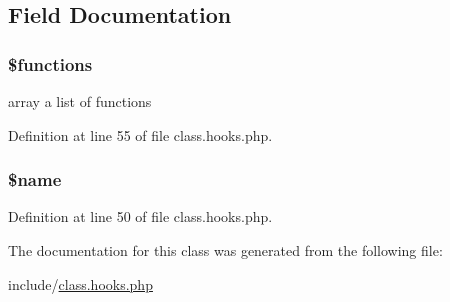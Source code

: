 \subsection{Field Documentation}
\hypertarget{class_filter_aa75daea491817f3b64daa2f51128bcdf}{
\subsubsection[{\$functions}]{\setlength{\rightskip}{0pt plus 5cm}\$functions}}\label{class_filter_aa75daea491817f3b64daa2f51128bcdf}
array a list of functions 

Definition at line 55 of file class.\-hooks.\-php.

\hypertarget{class_filter_ab2fc40d43824ea3e1ce5d86dee0d763b}{
\subsubsection[{\$name}]{\setlength{\rightskip}{0pt plus 5cm}\$name}}\label{class_filter_ab2fc40d43824ea3e1ce5d86dee0d763b}


Definition at line 50 of file class.\-hooks.\-php.



The documentation for this class was generated from the following file\-:\begin{DoxyCompactItemize}
\item 
include/\hyperlink{class_8hooks_8php}{class.\-hooks.\-php}\end{DoxyCompactItemize}
